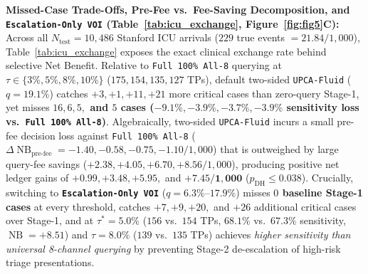 \documentclass[11pt]{article}
\theoremstyle{remark}
\begin{document}
\textbf{Missed-Case Trade-Offs, Pre-Fee vs.\ Fee-Saving Decomposition, and \texttt{Escalation-Only VOI} (Table~\ref{tab:icu_exchange}, Figure~\ref{fig:fig5}C):} Across all $N_{\text{test}}=10{,}486$ Stanford ICU arrivals ($229$ true events $= 21.84/1{,}000$), Table~\ref{tab:icu_exchange} exposes the exact clinical exchange rate behind selective Net Benefit. Relative to \texttt{Full 100\% All-8} querying at $\tau \in \{3\%, 5\%, 8\%, 10\%\}$ ($175, 154, 135, 127$ TPs), default two-sided \texttt{UPCA-Fluid} ($q=19.1\%$) catches $+3, +1, +11, +21$ more critical cases than zero-query Stage-1, yet misses \textbf{$16, 6, 5,$ and $5$ cases ($-9.1\%, -3.9\%, -3.7\%, -3.9\%$ sensitivity loss vs.\ \texttt{Full 100\% All-8})}. Algebraically, two-sided \texttt{UPCA-Fluid} incurs a small pre-fee decision loss against \texttt{Full 100\% All-8} ($\Delta\operatorname{NB}_{\text{pre-fee}} = -1.40, -0.58, -0.75, -1.10/1{,}000$) that is outweighed by large query-fee savings ($+2.38, +4.05, +6.70, +8.56/1{,}000$), producing positive net ledger gains of $\mathbf{+0.99, +3.48, +5.95,}$ and $\mathbf{+7.45/1{,}000}$ ($p_{\text{DH}} \le 0.038$). Crucially, switching to \textbf{\texttt{Escalation-Only VOI}} ($q=6.3\%\text{--}17.9\%$) misses \textbf{$0$ baseline Stage-1 cases} at every threshold, catches $+7, +9, +20,$ and $+26$ additional critical cases over Stage-1, and at $\tau^*=5.0\%$ ($156$ vs.\ $154$ TPs, $68.1\%$ vs.\ $67.3\%$ sensitivity, $\operatorname{NB}=+8.51$) and $\tau=8.0\%$ ($139$ vs.\ $135$ TPs) achieves \emph{higher sensitivity than universal 8-channel querying} by preventing Stage-2 de-escalation of high-risk triage presentations.
\end{document}
